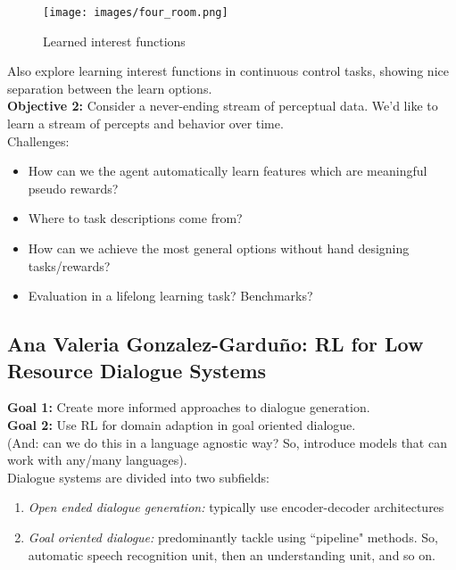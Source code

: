 \begin{figure}[h!]
    \centering
    \texttt{[image: images/four\_room.png]}
    \caption{Learned interest functions}
    \label{fig:opt_four}
\end{figure}

Also explore learning interest functions in continuous control tasks, showing nice separation between the learn options. \\

{\bf Objective 2:} Consider a never-ending stream of perceptual data. We'd like to learn a stream of percepts and behavior over time. \\

Challenges:
\begin{itemize}
    \item How can we the agent automatically learn features which are meaningful pseudo rewards?
    \item Where to task descriptions come from?
    \item How can we achieve the most general options without hand designing tasks/rewards?
    \item Evaluation in a lifelong learning task? Benchmarks?
\end{itemize}


\spacerule
\subsection{Ana Valeria Gonzalez-Garduño: RL for Low Resource Dialogue Systems}

{\bf Goal 1:} Create more informed approaches to dialogue generation. \\

{\bf Goal 2:} Use RL for domain adaption in goal oriented dialogue. \\

(And: can we do this in a language agnostic way? So, introduce models that can work with any/many languages). \\

Dialogue systems are divided into two subfields:
\begin{enumerate}
    \item {\it Open ended dialogue generation:} typically use encoder-decoder architectures
    \item {\it Goal oriented dialogue:} predominantly tackle using ``pipeline" methods. So, automatic speech recognition unit, then an understanding unit, and so on.
\end{enumerate}

